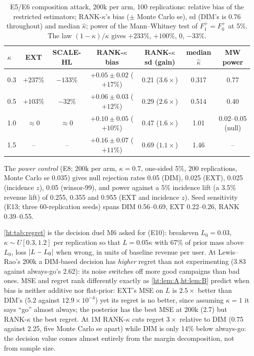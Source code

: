 \begin{table}[htbp]
\centering\small
\caption{E5/E6 composition attack, 200k per arm, 100 replications: relative bias of the restricted estimators; RANK-$\kappa$'s bias ($\pm$ Monte Carlo se), sd (DIM's is 0.76 throughout) and median $\hat\kappa$; power of the Mann--Whitney test of $F_1^+ = F_0^+$ at 5\%. The law $(1 - \kappa)/\kappa$ gives $+233\%$, $+100\%$, 0, $-33\%$.}
\label{ht:tab:comp}
\begin{tabular}{lcccccc}
\toprule
$\kappa$ & EXT & SCALE-HL & RANK-$\kappa$ bias & RANK-$\kappa$ sd (gain) & median $\hat\kappa$ & MW power \\
\midrule
0.3 & $+237\%$ & $-133\%$ & $+0.05 \pm 0.02$ ($+17\%$) & 0.21 ($3.6\times$) & 0.317 & 0.77 \\
0.5 & $+103\%$ & $-32\%$ & $+0.06 \pm 0.03$ ($+12\%$) & 0.29 ($2.6\times$) & 0.514 & 0.40 \\
1.0 & $\approx 0$ & $\approx 0$ & $+0.10 \pm 0.05$ ($+10\%$) & 0.47 ($1.6\times$) & 1.01 & 0.02--0.05 (null) \\
1.5 & -- & -- & $+0.16 \pm 0.07$ ($+11\%$) & 0.69 ($1.1\times$) & 1.46 & -- \\
\bottomrule
\end{tabular}
\end{table}

The \emph{power control} (E8; 200k per arm, $\kappa = 0.7$, one-sided 5\%, 200 replications, Monte Carlo se 0.035) gives null rejection rates 0.05 (DIM), 0.025 (EXT), 0.025 (incidence $z$), 0.05 (winsor-99), and power against a 5\% incidence lift (a 3.5\% revenue lift) of 0.255, 0.355 and 0.955 (EXT and incidence $z$). Seed sensitivity (E13; three 60-replication seeds) spans DIM 0.56--0.69, EXT 0.22--0.26, RANK 0.39--0.55.

\cref{ht:tab:regret} is the decision duel M6 asked for (E10): breakeven $L_0 = 0.03$, $\kappa \sim U[0.3, 1.2]$ per replication so that $L = 0.05\kappa$ with 67\% of prior mass above $L_0$, loss $\left|L - L_0\right|$ when wrong, in units of baseline revenue per user. At Lewis--Rao's 200k a DIM-based decision has \emph{higher} regret than not experimenting (3.83 against always-go's 2.62): its noise switches off more good campaigns than bad ones. MSE and regret rank differently exactly as \cref{ht:lem:A,ht:lem:B} predict when bias is neither additive nor flat-prior: EXT's MSE on $L$ is $2.5\times$ better than DIM's ($5.2$ against $12.9 \times 10^{-4}$) yet its regret is no better, since assuming $\kappa = 1$ it says ``go'' almost always; the posterior has the best MSE at 200k (2.7) but RANK-$\kappa$ the best regret. At 1M RANK-$\kappa$ cuts regret $3\times$ relative to DIM (0.75 against 2.25, five Monte Carlo se apart) while DIM is only 14\% below always-go: the decision value comes almost entirely from the margin decomposition, not from sample size.

